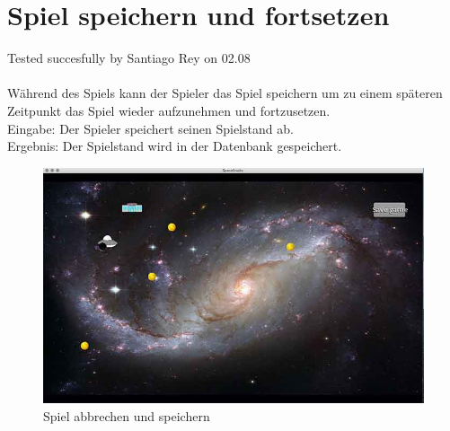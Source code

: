 \documentclass[12pt]{article}
\begin{document}
\newpage
\section{Spiel speichern und fortsetzen}
Tested succesfully by Santiago Rey on 02.08\\\\
Während des Spiels kann der Spieler das Spiel speichern um zu einem späteren Zeitpunkt das Spiel wieder aufzunehmen und fortzusetzen.\\
Eingabe: Der Spieler speichert seinen Spielstand ab.\\
Ergebnis: Der Spielstand wird in der Datenbank gespeichert.\\
\begin{figure}[htp]
	\centering
	\includegraphics[scale=0.6]{TestProtocolBilder/continue1@0,25x.jpg}
	\caption{Spiel abbrechen und speichern}
\end{figure}
\end{document}
